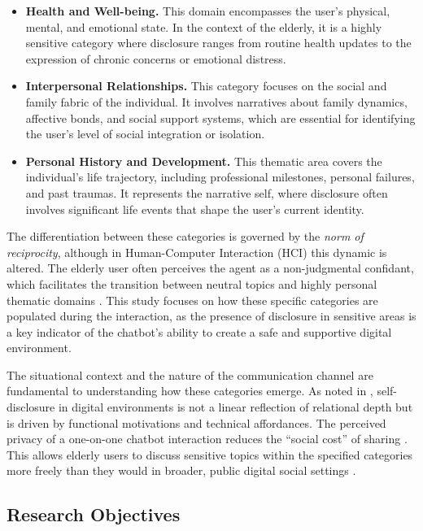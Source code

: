 \begin{itemize}
    \item \textbf{Health and Well-being.} This domain encompasses the user's physical, mental, and emotional state. In the context of the elderly, it is a highly sensitive category where disclosure ranges from routine health updates to the expression of chronic concerns or emotional distress.
    \item \textbf{Interpersonal Relationships.} This category focuses on the social and family fabric of the individual. It involves narratives about family dynamics, affective bonds, and social support systems, which are essential for identifying the user's level of social integration or isolation.
    \item \textbf{Personal History and Development.} This thematic area covers the individual's life trajectory, including professional milestones, personal failures, and past traumas. It represents the narrative self, where disclosure often involves significant life events that shape the user's current identity.
\end{itemize}



The differentiation between these categories is governed by the \textit{norm of reciprocity}, although in Human-Computer Interaction (HCI) this dynamic is altered. The elderly user often perceives the agent as a non-judgmental confidant, which facilitates the transition between neutral topics and highly personal thematic domains \cite{Keeler2026}. This study focuses on how these specific categories are populated during the interaction, as the presence of disclosure in sensitive areas is a key indicator of the chatbot's ability to create a safe and supportive digital environment.

The situational context and the nature of the communication channel are fundamental to understanding how these categories emerge. As noted in \cite{Bazarova2014}, self-disclosure in digital environments is not a linear reflection of relational depth but is driven by functional motivations and technical affordances. The perceived privacy of a one-on-one chatbot interaction reduces the ``social cost'' of sharing \cite{Tesfay2019}. This allows elderly users to discuss sensitive topics within the specified categories more freely than they would in broader, public digital social settings \cite{Meng2025}.

  \subsection{Research Objectives}

